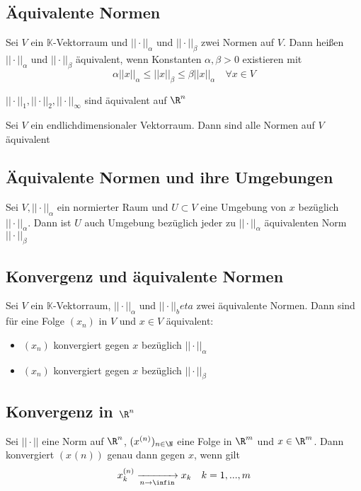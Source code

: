 	\subsection{Äquivalente Normen}
		\begin{Definition} 
			Sei $V$ ein $\mathbb{K}$-Vektorraum und $||\cdot||_\alpha$ und $||\cdot||_\beta$ zwei Normen auf $V$. Dann heißen $||\cdot||_\alpha$ und $||\cdot||_\beta$ äquivalent, wenn Konstanten $\alpha, \beta > 0$ existieren mit 
			$$
				\alpha||x||_\alpha \leq ||x||_\beta \leq \beta||x||_\alpha \quad \forall x \in V
			$$
		\end{Definition}
		\begin{Satz} [ ]
			$||\cdot||_1, ||\cdot||_2, ||\cdot||_\infty$ sind äquivalent auf $\R^n$
		\end{Satz}
		\begin{Satz} [ ]
			Sei $V$ ein endlichdimensionaler Vektorraum. Dann sind alle Normen auf $V$ äquivalent
		\end{Satz}
	\subsection{Äquivalente Normen und ihre Umgebungen}
		\begin{Satz} [ ]
			Sei $V, ||\cdot||_\alpha$ ein normierter Raum und $U \subset V$ eine Umgebung von $x$ bezüglich $||\cdot||_\alpha$. Dann ist $U$ auch Umgebung bezüglich jeder zu $||\cdot||_\alpha$ äquivalenten Norm $||\cdot||_\beta$
		\end{Satz}
	\subsection{Konvergenz und äquivalente Normen}
		\begin{Satz} [ ]
			Sei $V$ ein $\mathbb{K}$-Vektorraum, $||\cdot||_\alpha $ und $||\cdot||_beta$ zwei äquivalente Normen. Dann sind für eine Folge $(x_n)$ in $V$ und $x \in V$ äquivalent:
			\begin{itemize}
				\item $(x_n)$ konvergiert gegen $x$ bezüglich $||\cdot||_\alpha$
				\item $(x_n)$ konvergiert gegen $x$ bezüglich $||\cdot||_\beta$
			\end{itemize}
		\end{Satz}
	\subsection{Konvergenz in $\R^n$}
		\begin{Satz} [ ]
			Sei $||\cdot||$ eine Norm auf $\R^n$, $(x^{(n)})_{n\in\N}$ eine Folge in $\R^m$ und $x\in\R^m$. Dann konvergiert $(x^{}(n))$ genau dann gegen $x$, wenn gilt
			$$
				x^{(n)}_k \xrightarrow[n\to\infin]{}x_k \quad k=1,...,m
			$$
		\end{Satz}
